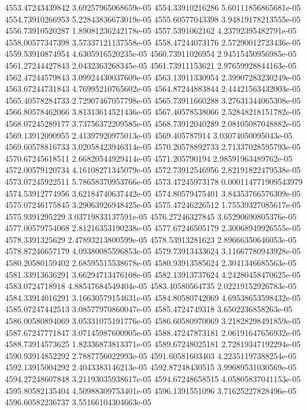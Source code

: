 {4553.47243439842 3.69257965068659e-05
4554.33910216286 5.60111856865681e-05
4554.73910266953 5.22843836673019e-05
4555.60577043398 3.94819178213555e-05
4556.73910520287 1.89081236242178e-05
4557.5391062162 4.23792395482791e-05
4558.00577347398 3.57337121137558e-05
4558.47244073176 2.57290012723436e-05
4559.53910874954 4.6305916520235e-05
4560.73911026954 2.94515450956985e-05
4561.27244427843 2.0432363268345e-05
4561.73911153621 2.97659928844163e-05
4562.47244579843 3.09924430037609e-05
4563.13911330954 2.39907283230249e-05
4563.67244731843 4.76995210765602e-05
4564.87244883844 2.44421563432003e-05
4565.40578284733 2.72907467057798e-05
4565.73911660288 3.27631344065308e-05
4566.80578462066 3.81313614521436e-05
4567.40578538066 2.52848218151782e-05
4568.07245289177 3.73756372209585e-05
4568.73912040289 2.08105087048882e-05
4569.13912090955 2.41397920975013e-05
4569.405787914 3.03074050095043e-05
4569.60578816733 3.02058423946314e-05
4570.20578892733 2.71337028595793e-05
4570.67245618511 2.66820544929414e-05
4571.205790194 2.98591963489762e-05
4572.00579120734 4.16108271345079e-05
4572.73912546956 2.82191822479538e-05
4573.07245922511 5.78658370953766e-05
4573.47245973178 0.000114771909543979
4574.53912774956 3.62184740637442e-05
4574.80579475401 3.84353766576309e-05
4575.07246175845 3.29063926948425e-05
4575.47246226512 1.75539327085617e-05
4575.9391295229 3.03719833137591e-05
4576.27246327845 3.65290690805376e-05
4577.00579754068 2.81216353190238e-05
4577.67246505179 2.30068949926555e-05
4578.3391325629 2.47893213800599e-05
4578.53913281623 2.89666350646053e-05
4578.87246657179 4.09380085596853e-05
4579.73913433624 3.11667780943928e-05
4580.20580159402 2.68595515538678e-05
4580.93913585624 2.3041346685563e-05
4581.33913636291 3.66294713476108e-05
4582.13913737624 4.24280458470625e-05
4583.0724718918 4.88547684549404e-05
4583.40580564735 2.02219152926783e-05
4584.33914016291 3.16630579154631e-05
4584.80580742069 4.69538653598432e-05
4585.07247442513 3.08577970860047e-05
4585.4724749318 3.6502236858263e-05
4586.00580894069 3.05331075191776e-05
4586.60580970069 3.21828298491859e-05
4587.67247771847 3.07145987600905e-05
4588.47247873181 2.06191647656932e-05
4588.73914573625 1.82336873813371e-05
4589.67248025181 2.72819347192294e-05
4590.93914852292 2.7887756022993e-05
4591.60581603403 4.22351197388254e-05
4592.13915004292 2.4043383146213e-05
4592.87248430515 3.99689531030569e-05
4594.27248607848 3.21193035938617e-05
4594.67248658515 4.05805837041153e-05
4595.80582135404 4.50988309753401e-05
4596.1391551096 3.71625227828496e-05
4596.60582236737 3.55166104304663e-05
}
